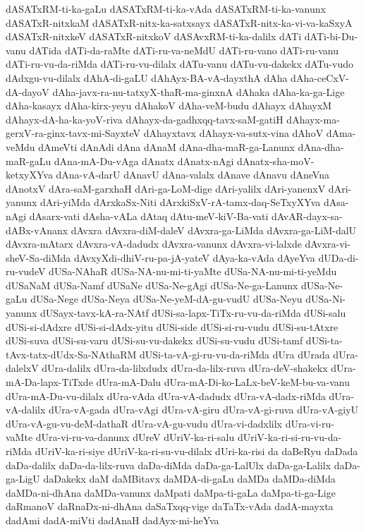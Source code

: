 {dASATxRM-ti-ka-gaLu
dASATxRM-ti-ka-vAda
dASATxRM-ti-ka-vanunx
dASATxR-nitxkaM
dASATxR-nitx-ka-satxsayx
dASATxR-nitx-ka-vi-va-kaSxyA
dASATxR-nitxkeV
dASATxR-nitxkoV
dASAvxRM-ti-ka-dalilx
dATi
dATi-bi-Du-vanu
dATida
dATi-da-raMte
dATi-ru-va-neMdU
dATi-ru-vano
dATi-ru-vanu
dATi-ru-vu-da-riMda
dATi-ru-vu-dilalx
dATu-vanu
dATu-vu-dakekx
dATu-vudo
dAdxgu-vu-dilalx
dAhA-di-gaLU
dAhAyx-BA-vA-dayxthA
dAha
dAha-ceCxV-dA-dayoV
dAha-javx-ra-nu-tatxyX-thaR-ma-ginxnA
dAhaka
dAha-ka-ga-Lige
dAha-kasayx
dAha-kirx-yeyu
dAhakoV
dAha-veM-budu
dAhayx
dAhayxM
dAhayx-dA-ha-ka-yoV-riva
dAhayx-da-gadhxqq-tavx-saM-gatiH
dAhayx-ma-gerxV-ra-ginx-tavx-mi-SayxteV
dAhayxtavx
dAhayx-va-sutx-vina
dAhoV
dAma-veMdu
dAmeVti
dAnAdi
dAna
dAnaM
dAna-dha-maR-ga-Lanunx
dAna-dha-maR-gaLu
dAna-mA-Du-vAga
dAnatx
dAnatx-nAgi
dAnatx-sha-moV-ketxyXYva
dAna-vA-darU
dAnavU
dAna-valalx
dAnave
dAnavu
dAneVna
dAnotxV
dAra-saM-garxhaH
dAri-ga-LoM-dige
dAri-yalilx
dAri-yanenxV
dAri-yanunx
dAri-yiMda
dArxkaSx-Niti
dArxkiSxV-rA-tamx-daq-SeTxyXYva
dAsa-nAgi
dAsarx-vati
dAsha-vALa
dAtaq
dAtu-meV-kiV-Ba-vati
dAvAR-dayx-sa-dABx-vAnanx
dAvxra
dAvxra-diM-daleV
dAvxra-ga-LiMda
dAvxra-ga-LiM-dalU
dAvxra-mAtarx
dAvxra-vA-dadudx
dAvxra-vanunx
dAvxra-vi-lalxde
dAvxra-vi-sheV-Sa-diMda
dAvxyXdi-dhiV-ru-pa-jA-yateV
dAya-ka-vAda
dAyeYva
dUDa-di-ru-vudeV
dUSa-NAhaR
dUSa-NA-nu-mi-ti-yaMte
dUSa-NA-nu-mi-ti-yeMdu
dUSaNaM
dUSa-Namf
dUSaNe
dUSa-Ne-gAgi
dUSa-Ne-ga-Lanunx
dUSa-Ne-gaLu
dUSa-Nege
dUSa-Neya
dUSa-Ne-yeM-dA-gu-vudU
dUSa-Neyu
dUSa-Ni-yanunx
dUSayx-tavx-kA-ra-NAtf
dUSi-sa-lapx-TiTx-ru-vu-da-riMda
dUSi-salu
dUSi-si-dAdxre
dUSi-si-dAdx-yitu
dUSi-side
dUSi-si-ru-vudu
dUSi-su-tAtxre
dUSi-suva
dUSi-su-varu
dUSi-su-vu-dakekx
dUSi-su-vudu
dUSi-tamf
dUSi-ta-tAvx-tatx-dUdx-Sa-NAthaRM
dUSi-ta-vA-gi-ru-vu-da-riMda
dUra
dUrada
dUra-dalelxV
dUra-dalilx
dUra-da-lilxdudx
dUra-da-lilx-ruva
dUra-deV-shakekx
dUra-mA-Da-lapx-TiTxde
dUra-mA-Dalu
dUra-mA-Di-ko-LaLx-beV-keM-bu-va-vanu
dUra-mA-Du-vu-dilalx
dUra-vAda
dUra-vA-dadudx
dUra-vA-dadx-riMda
dUra-vA-dalilx
dUra-vA-gada
dUra-vAgi
dUra-vA-giru
dUra-vA-gi-ruva
dUra-vA-giyU
dUra-vA-gu-vu-deM-dathaR
dUra-vA-gu-vudu
dUra-vi-dadxlilx
dUra-vi-ru-vaMte
dUra-vi-ru-va-danunx
dUreV
dUriV-ka-ri-salu
dUriV-ka-ri-si-ru-vu-da-riMda
dUriV-ka-ri-siye
dUriV-ka-ri-su-vu-dilalx
dUri-ka-risi
da
daBeRyu
daDada
daDa-dalilx
daDa-da-lilx-ruva
daDa-diMda
daDa-ga-LalUlx
daDa-ga-Lalilx
daDa-ga-LigU
daDakekx
daM
daMBitavx
daMDA-di-gaLu
daMDa
daMDa-diMda
daMDa-ni-dhAna
daMDa-vanunx
daMpati
daMpa-ti-gaLa
daMpa-ti-ga-Lige
daRmanoV
daRnaDx-ni-dhAna
daSaTxqq-vige
daTaTx-vAda
dadA-mayxta
dadAmi
dadA-miVti
dadAnaH
dadAyx-mi-heYva
}
